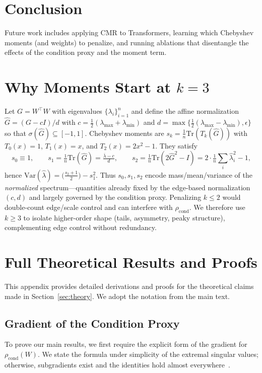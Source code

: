\documentclass{opt2025}
\newcommand{\Tr}{\mathrm{Tr}}
\newcommand{\cmr}{\textsc{CMR}\xspace}
\begin{document}
\section{Conclusion}
\label{sec:conclusion}
Future work includes applying \cmr to Transformers, learning which Chebyshev moments (and weights) to penalize, and running ablations that disentangle the effects of the condition proxy and the moment term.

\newpage



\newpage

\appendix

\section{Why Moments Start at $k=3$}
\label{app:k3-moments}
Let $G=W^\top W$ with eigenvalues $\{\lambda_i\}_{i=1}^n$ and define the affine normalization
$\widehat G=(G-cI)/d$ with $c=\tfrac{1}{2}(\lambda_{\max}+\lambda_{\min})$ and
$d=\max\{\tfrac{1}{2}(\lambda_{\max}-\lambda_{\min}),\epsilon\}$ so that $\sigma(\widehat G)\subseteq[-1,1]$.
Chebyshev moments are $s_k=\frac{1}{n}\Tr(T_k(\widehat G))$ with $T_0(x)=1$, $T_1(x)=x$, and $T_2(x)=2x^2-1$.
They satisfy
\[
s_0 \equiv 1,\qquad
s_1=\tfrac{1}{n}\Tr(\widehat G)=\tfrac{\overline{\lambda}-c}{d},\qquad
s_2=\tfrac{1}{n}\Tr(2\widehat G^2-I)=2\cdot \tfrac{1}{n}\sum_i \widehat\lambda_i^2 - 1,
\]
hence $\mathrm{Var}(\widehat\lambda)=\big(\tfrac{s_2+1}{2}\big)-s_1^2$.
Thus $s_0,s_1,s_2$ encode mass/mean/variance of the \emph{normalized} spectrum—quantities already fixed by the edge-based normalization $(c,d)$ and largely governed by the condition proxy.
Penalizing $k\le2$ would double-count edge/scale control and can interfere with $\rho_{\text{cond}}$.
We therefore use $k\ge3$ to isolate higher-order shape (tails, asymmetry, peaky structure), complementing edge control without redundancy.

\section{Full Theoretical Results and Proofs} \label{app:proofs}
This appendix provides detailed derivations and proofs for the theoretical claims made in Section~\ref{sec:theory}. We adopt the notation from the main text.

\subsection{Gradient of the Condition Proxy}
To prove our main results, we first require the explicit form of the gradient for $\rho_{\text{cond}}(W)$.
We state the formula under simplicity of the extremal singular values; otherwise, subgradients exist and the identities hold almost everywhere~\citep{Lewis1996,Bhatia1997}.
\end{document}
